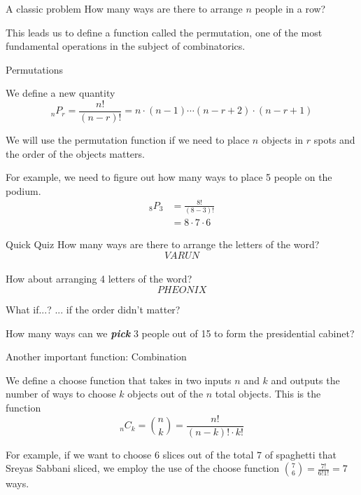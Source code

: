 \documentclass[aspectratio=169,xcolor=dvipsnames]{beamer}
\begin{document}
\begin{frame}[t]{A classic problem}
    How many ways are there to arrange $n$ people in a row?
    
    \vspace{5cm}
    
    This leads us to define a function called the permutation, one of the most fundamental operations in the subject of combinatorics.
\end{frame}

\begin{frame}[t]{Permutations}
    \begin{definition}
    We define a new quantity
    \[
        _nP_r=\frac{n!}{(n-r)!}=n\cdot(n-1)\cdots(n-r+2)\cdot(n-r+1)
    \]
    \end{definition}
    We will use the permutation function if we need to place $n$ objects in $r$ spots and the order of the objects matters.
    \vspace{1em}
    
    For example, we need to figure out how many ways to place 5 people on the podium.
    \begin{align*}
        _8P_3
        &=\frac{8!}{(8-3)!}\\
        &=8\cdot7\cdot6
    \end{align*}
\end{frame}
\begin{frame}[t]{Quick Quiz}
    How many ways are there to arrange the letters of the word?
    \[VARUN\] \\
    \vspace{1.5cm}
    How about arranging 4 letters of the word?
    \[PHEONIX\]
\end{frame}
\begin{frame}[t]{What if...?}
    ... if the order didn't matter?
    
    \vspace{.5em}
    
    How many ways can we \textit{\textbf{pick}} 3 people out of 15 to form the presidential cabinet?
\end{frame}

\begin{frame}[t]{Another important function: Combination}
    \begin{definition}
        We define a choose function that takes in two inputs $n$ and $k$ and outputs the number of ways to choose $k$ objects out of the $n$ total objects. This is the function
        \[
        _nC_k=\binom nk=\frac{n!}{(n-k)!\cdot k!}
        \]
    \end{definition}
    
    \vspace{2cm}
    
    For example, if we want to choose $6$ slices out of the total $7$ of spaghetti that Sreyas Sabbani sliced, we employ the use of the choose function $\binom 76=\frac{7!}{6!1!}=7$ ways.
\end{frame}
\end{document}

